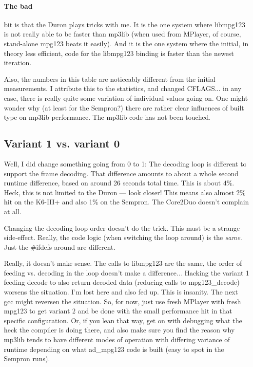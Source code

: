 \documentclass[a4paper,12pt]{scrartcl}
\begin{document}
\paragraph{The bad}
bit is that the Duron plays tricks with me.
It is the one system where libmpg123 is not really able to be faster than mp3lib (when used from MPlayer, of course, stand-alone mpg123 beats it easily).
And it is the one system where the initial, in theory less efficient, code for the libmpg123 binding is faster than the newest iteration.

Also, the numbers in this table are noticeably different from the initial measurements. I attribute this to the statistics, and changed CFLAGS... in any case, there is really quite some variation of individual values going on.
One might wonder why (at least for the Sempron?) there are rather clear influences of built type on mp3lib performance. The mp3lib code has not been touched.

\subsection{Variant 1 vs. variant 0}

Well, I did change something going from 0 to 1: The decoding loop is different to support the frame decoding.
That difference amounts to about a whole second runtime difference, based on around 26 seconds total time.
This is about 4\%.
Heck, this is not limited to the Duron --- look closer! This means also almost 2\% hit on the K6-III+ and also 1\% on the Sempron. The Core2Duo doesn't complain at all.

Changing the decoding loop order doesn't do the trick.
This must be a strange side-effect. Really, the code logic (when switching the loop around) is the {\em same}. Just the \#ifdefs around are different.

Really, it doesn't make sense. The calls to libmpg123 are the same, the order of feeding vs. decoding in the loop doesn't make a difference... Hacking the variant 1 feeding decode to also return decoded data (reducing calls to mpg123\_decode) worsens the situation. I'm lost here and also fed up.
This is insanity. The next gcc might reversen the situation. So, for now, just use fresh MPlayer with fresh mpg123 to get variant 2 and be done with the small performance hit in that specific configuration.
Or, if you lean that way, get on with debugging what the heck the compiler is doing there, and also make sure you find the reason why mp3lib tends to have different modes of operation with differing variance of runtime depending on what ad\_mpg123 code is built (easy to spot in the Sempron runs).
\end{document}

